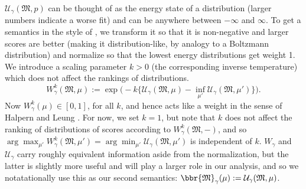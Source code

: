\documentclass{article}
\theoremstyle{plain}
\theoremstyle{definition}
\theoremstyle{remark}
\newcommand{\dg}[1]{\mathfrak{#1}}
\numberwithin{equation}{section}
\begin{document}
{$\mathcal U_\gamma(\dg M, p)$ can be thought of as the energy state of
        a distribution (larger numbers indicate a worse fit) and can
        be anywhere between $-\infty$ and $\infty$.
        To get a semantics in the style of \cite{halpern2015weighted},
        we transform it so that it is non-negative and larger scores
        are better (making it distribution-like, by analogy to a
        Boltzmann distribution) and normalize so that the lowest
        energy distributions get weight 1. We introduce a scaling
        parameter $k > 0$ (the corresponding inverse temperature)
       which does not affect the rankings of distributions. 
       \[ W^k_\gamma(\dg M, \mu) := \exp\Big(  -k \Big\{\mathcal U_{\gamma}(\dg M,\mu)- \inf_{\mu'} \mathcal U_\gamma(\dg M,\mu')\Big\} \Big).\]
Now 
$W^k_\gamma(\mu) \in  [0,1]$, for all $k$, and hence acts like a weight in the sense of  Halpern and Leung \citeyear{halpern2015weighted}.
For now, we set $k=1$, but note that $k$ does not affect the ranking of distributions of scores according to $W^k_\gamma(\dg M, -)$, and so $\arg\max_{\mu'} W^k_\gamma(\dg M, \mu')  = \arg\min_{\mu'} \mathcal U_\gamma(\dg M,\mu')$ is independent of $k$. 
%
$W_\gamma$ and $\mathcal U_\gamma$ carry roughly equivalent information aside from the normalization, but the latter is slightly more useful and will play a larger role in our analysis, and so we notatationally use this as our second semantics: $\bbr{\dg M}_\gamma(\mu) := \mathcal U_\gamma(\dg M, \mu)$.
}
\end{document}
